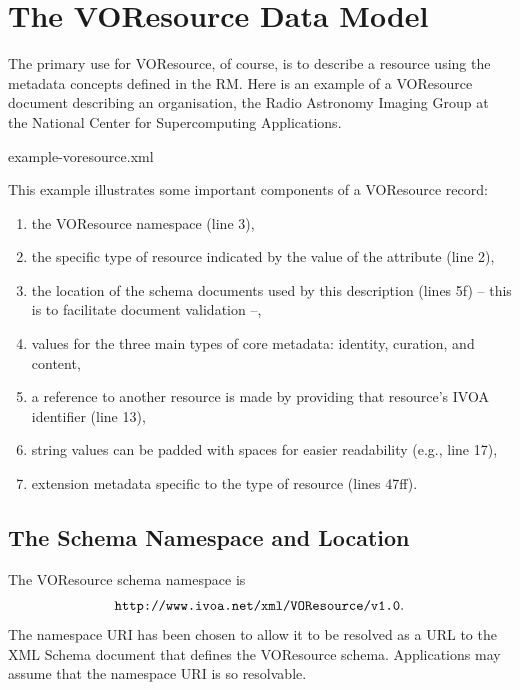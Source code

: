 \documentclass[11pt,a4paper]{ivoa}
\begin{document}
\section{The VOResource Data Model}
\label{sect:model}

The primary use for VOResource, of course, is to describe a resource
using the metadata concepts defined in the RM.  Here is an example of a
VOResource document describing an organisation, the Radio Astronomy
Imaging Group at the National Center for Supercomputing Applications.  


   {example-voresource.xml}

This example illustrates some important components of a VOResource
record:

\begin{enumerate}
  \item the VOResource namespace (line 3),
  \item the specific type of resource indicated by
       the value of the  attribute (line 2),
  \item the location of the schema documents used by
       this description (lines 5f) -- this is to facilitate document
       validation --,
  \item values for the three main types of core metadata:
       identity, curation, and content,
  \item a reference to another resource is made by
       providing that resource's IVOA identifier (line 13),
  \item string values can be padded with spaces
       for easier readability (e.g., line 17),
  \item extension metadata specific to the type of
       resource (lines 47ff).
\end{enumerate}


\subsection{The Schema Namespace and Location}

\label{sect:namespace}


The VOResource schema namespace is 
$$\hbox{\texttt{http://www.ivoa.net/xml/VOResource/v1.0}}.$$
The namespace URI has been chosen to allow it to be resolved as a URL
to the XML Schema document that defines the VOResource schema.
Applications may assume that the namespace URI is so resolvable.
\end{document}
